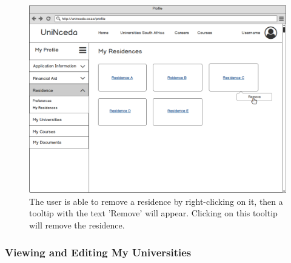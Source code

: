 \documentclass[a4paper, 12pt]{article}
\begin{document}
\renewcommand{\figurename}{Figure}
\setcounter{figure}{0}

\begin{figure}[H]
\centering
\includegraphics[scale=0.5]{ProfileResidenceResidencesRemoveResidence}
\caption{The user is able to remove a residence by right-clicking on it, then a tooltip with the text 'Remove' will appear. Clicking on this tooltip will remove the residence.}
\label{ProfileResidenceResidencesRemoveResidence}
\end{figure}

\newpage
\subsubsection{Viewing and Editing My Universities}

\setcounter{figure}{0}
\end{document}
